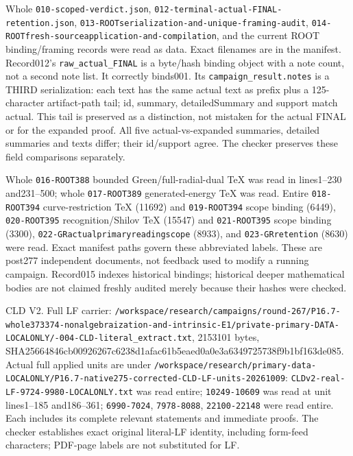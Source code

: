 \documentclass[11pt]{article}
\begin{document}
Whole \texttt{010-scoped-verdict.json}, \texttt{012-terminal-actual-FINAL-retention.json}, \texttt{013-ROOTserialization-and-unique-framing-audit}, \texttt{014-ROOTfresh-sourceapplication-and-compilation}, and the current ROOT binding/framing records were read as data. Exact filenames are in the manifest. Record012's \texttt{raw\_actual\_FINAL} is a byte/hash binding object with a note count, not a second note list. It correctly binds001. Its \texttt{campaign\_result.notes} is a THIRD serialization: each text has the same actual text as prefix plus a 125-character artifact-path tail; id, summary, detailedSummary and support match actual. This tail is preserved as a distinction, not mistaken for the actual FINAL or for the expanded proof. All five actual-vs-expanded summaries, detailed summaries and texts differ; their id/support agree. The checker preserves these field comparisons separately.

Whole \texttt{016-ROOT388} bounded Green/full-radial-dual TeX was read in lines1--230 and231--500; whole \texttt{017-ROOT389} generated-energy TeX was read. Entire \texttt{018-ROOT394} curve-restriction TeX (11692) and \texttt{019-ROOT394} scope binding (6449), \texttt{020-ROOT395} recognition/Shilov TeX (15547) and \texttt{021-ROOT395} scope binding (3300), \texttt{022-GRactualprimaryreadingscope} (8933), and \texttt{023-GRretention} (8630) were read. Exact manifest paths govern these abbreviated labels. These are post277 independent documents, not feedback used to modify a running campaign. Record015 indexes historical bindings; historical deeper mathematical bodies are not claimed freshly audited merely because their hashes were checked.

CLD V2. Full LF carrier: \texttt{/\allowbreak workspace/\allowbreak research/\allowbreak campaigns/\allowbreak round-267/\allowbreak P16.7-whole373374-nonalgebraization-and-intrinsic-E1/\allowbreak private-primary-DATA-LOCALONLY/-004-CLD-literal\_extract.txt}, 2153101 bytes, SHA25664846cb00926267c6238d1afac61b5eaed0a0e3a6349725738f9b1bf163de085. Actual full applied units are under \texttt{/\allowbreak workspace/\allowbreak research/\allowbreak primary-data-LOCALONLY/\allowbreak P16.7-native275-corrected-CLD-LF-units-20261009}: \texttt{CLDv2-real-LF-9724-9980-LOCALONLY.txt} was read entire; \texttt{10249-10609} was read at unit lines1--185 and186--361; \texttt{6990-7024}, \texttt{7978-8088}, \texttt{22100-22148} were read entire. Each includes its complete relevant statements and immediate proofs. The checker establishes exact original literal-LF identity, including form-feed characters; PDF-page labels are not substituted for LF.
\end{document}
